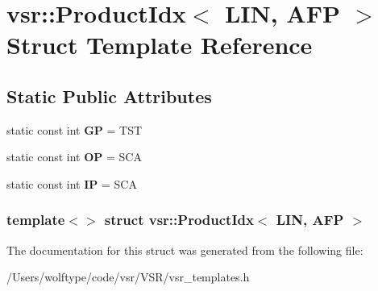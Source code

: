 \hypertarget{structvsr_1_1_product_idx_3_01_l_i_n_00_01_a_f_p_01_4}{\section{vsr\-:\-:Product\-Idx$<$ L\-I\-N, A\-F\-P $>$ Struct Template Reference}
\label{structvsr_1_1_product_idx_3_01_l_i_n_00_01_a_f_p_01_4}
}
\subsection*{Static Public Attributes}
\begin{DoxyCompactItemize}
\item 
\hypertarget{structvsr_1_1_product_idx_3_01_l_i_n_00_01_a_f_p_01_4_aa76b1bb537ed6f2733b89b306feb91d7}{static const int {\bfseries G\-P} = T\-S\-T}\label{structvsr_1_1_product_idx_3_01_l_i_n_00_01_a_f_p_01_4_aa76b1bb537ed6f2733b89b306feb91d7}

\item 
\hypertarget{structvsr_1_1_product_idx_3_01_l_i_n_00_01_a_f_p_01_4_a0088a8b886967c91aca8c955fc57f95b}{static const int {\bfseries O\-P} = S\-C\-A}\label{structvsr_1_1_product_idx_3_01_l_i_n_00_01_a_f_p_01_4_a0088a8b886967c91aca8c955fc57f95b}

\item 
\hypertarget{structvsr_1_1_product_idx_3_01_l_i_n_00_01_a_f_p_01_4_aeabbb0e7108bc64c90f904c92aa4ec63}{static const int {\bfseries I\-P} = S\-C\-A}\label{structvsr_1_1_product_idx_3_01_l_i_n_00_01_a_f_p_01_4_aeabbb0e7108bc64c90f904c92aa4ec63}

\end{DoxyCompactItemize}
\subsubsection*{template$<$$>$ struct vsr\-::\-Product\-Idx$<$ L\-I\-N, A\-F\-P $>$}



The documentation for this struct was generated from the following file\-:\begin{DoxyCompactItemize}
\item 
/\-Users/wolftype/code/vsr/\-V\-S\-R/vsr\-\_\-templates.\-h\end{DoxyCompactItemize}
